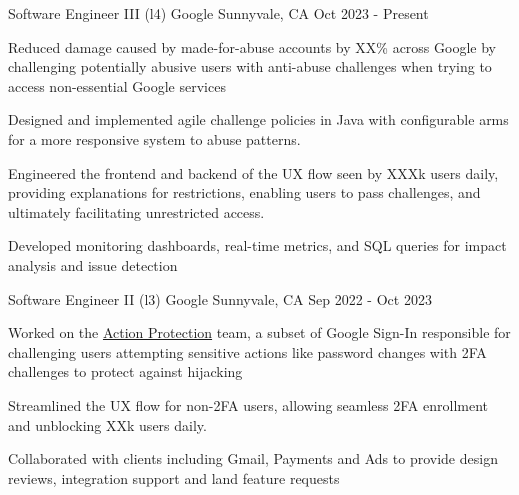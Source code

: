 
\hypersetup{
    colorlinks=true,
    linkcolor=blue,
    filecolor=magenta,
    urlcolor=awesome,
}



\begin{cventries}

  \cventry
	{Software Engineer III (l4)}
    {Google}
    {Sunnyvale, CA}
    {Oct 2023 - Present}
    {
      \begin{cvitems}
        \item Reduced damage caused by made-for-abuse accounts by XX\% across Google by challenging potentially abusive users with anti-abuse challenges when trying to access non-essential Google services
		\item Designed and implemented agile challenge policies in Java with configurable arms for a more responsive system to abuse patterns.
		\item Engineered the frontend and backend of the UX flow seen by XXXk users daily, providing explanations for restrictions, enabling users to pass challenges, and ultimately facilitating unrestricted access.
		\item Developed monitoring dashboards, real-time metrics, and SQL queries for impact analysis and issue detection
      \end{cvitems}
    }

  \cventry
	{Software Engineer II (l3)}
    {Google}
    {Sunnyvale, CA}
    {Sep 2022 - Oct 2023}
    {
      \begin{cvitems}
	  \item Worked on the \href{https://support.google.com/accounts/answer/7162782}{Action Protection} team, a subset of Google Sign-In responsible for challenging users attempting sensitive actions like password changes with 2FA challenges to protect against hijacking
	  \item Streamlined the UX flow for non-2FA users, allowing seamless 2FA enrollment and unblocking XXk users daily.
	  \item Collaborated with clients including Gmail, Payments and Ads to provide design reviews, integration support and land feature requests
      \end{cvitems}
    }


\end{cventries}
